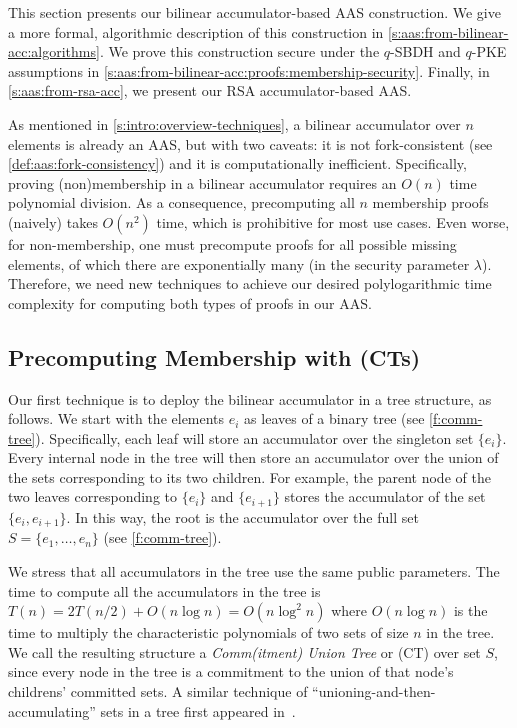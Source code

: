 This section presents our bilinear accumulator-based AAS construction.
We give a more formal, algorithmic description of this construction in \cref{s:aas:from-bilinear-acc:algorithms}.
We prove this construction secure under the $q$-SBDH and $q$-PKE assumptions in \cref{s:aas:from-bilinear-acc:proofs:membership-security}.
Finally, in \cref{s:aas:from-rsa-acc}, we present our RSA accumulator-based AAS.

As mentioned in \cref{s:intro:overview-techniques}, a bilinear accumulator over $n$ elements is already an AAS, but with two caveats: it is not fork-consistent (see \cref{def:aas:fork-consistency}) and it is computationally inefficient.
Specifically, proving (non)membership in a bilinear accumulator requires an $O(n)$ time polynomial division.
As a consequence, precomputing all $n$ membership proofs (naively) takes $O(n^2)$ time, which is prohibitive for most use cases.
Even worse, for non-membership, one must precompute proofs for all possible missing elements, of which there are exponentially many (in the security parameter $\lambda$).
Therefore, we need new techniques to achieve our desired polylogarithmic time complexity for computing both types of proofs in our AAS.

\subsection{Precomputing Membership with \communionTrees (CTs)}
\label{s:aas:from-bilinear-acc:ct}

\communionTreeFig

Our first technique is to deploy the bilinear accumulator in a tree structure, as follows.
We start with the elements $e_i$ as leaves of a binary tree (see \cref{f:comm-tree}).
Specifically, each leaf will store an accumulator over the singleton set $\{e_i\}$.
Every internal node in the tree will then store an accumulator over the union of the sets corresponding to its two children.
For example, the parent node of the two leaves corresponding to $\{e_i\}$ and $\{e_{i+1}\}$ stores the accumulator of the set $\{e_i,e_{i+1}\}$.
In this way, the root is the accumulator over the full set $S = \{e_1,\dots,e_n\}$ (see \cref{f:comm-tree}).

We stress that all accumulators in the tree use the same public parameters.
The time to compute all the accumulators in the tree is $T(n) = 2T(n/2) + O(n\log{n}) = O(n\log^2{n})$ where $O(n\log{n})$ is the time to multiply the characteristic polynomials of two sets of size $n$ in the tree.
We call the resulting structure a \textit{Comm(itment) Union Tree} or \emph{\communionTree} (CT) over set $S$, since every node in the tree is a commitment to the union of that node's childrens' committed sets.
A similar technique of ``unioning-and-then-accumulating'' sets in a tree first appeared in~\cite{CG10}.

